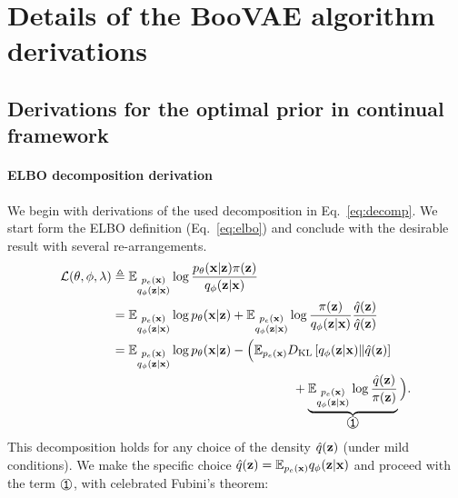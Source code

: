 \section{Details of the BooVAE algorithm derivations}\label{app:algodetails}

\subsection{Derivations for the optimal prior in continual framework}
\label{app:MEPVI}
\paragraph{ELBO decomposition derivation}
We begin with derivations of the used decomposition in Eq.~\ref{eq:decomp}. We start form the ELBO definition (Eq.~\ref{eq:elbo}) and conclude with the desirable result with several re-arrangements. 
\begin{equation}
\label{eq:app_decomp_begin}
    \begin{aligned}
     \mathcal{L}(\theta, \phi, \lambda) &\triangleq  \E_{\substack{p_{e}(\rvx)\\q_{\phi}(\rvz|\rvx)}}\log \dfrac{p_{\theta}(\rvx|\rvz)\pi(\rvz)}{q_{\phi}(\rvz|\rvx)} \\
   & = \E_{\substack{p_{e}(\rvx)\\q_{\phi}(\rvz|\rvx)}}\log p_{\theta}(\rvx|\rvz) + \E_{\substack{p_{e}(\rvx)\\q_{\phi}(\rvz|\rvx)}}\log\dfrac{\pi(\rvz)}{q_{\phi}(\rvz|\rvx)}\frac{\hat{q}(\rvz)}{\hat{q}(\rvz)} \\
    & = \E_{\substack{p_{e}(\rvx)\\q_{\phi}(\rvz|\rvx)}}\log p_{\theta}(\rvx|\rvz) - \Big(\E_{p_{e}(\rvx)}\KL{q_{\phi}(\rvz|\rvx)}{\hat{q}(\rvz)} \\
   &\hspace{50mm}  +\underbrace{\E_{\substack{p_{e}(\rvx)\\q_{\phi}(\rvz|\rvx)}}\log\dfrac{\hat{q}(\rvz)}{\pi(\rvz)}}_{\raisebox{.5pt}{\textcircled{\raisebox{-.9pt} {\text{\ttfamily 1}}}}}\Big).
    \end{aligned}
\end{equation}
This decomposition holds for any choice of the density $\hat{q}({\mathbf{z}})$ (under mild conditions). We make the specific choice $\hat{q}({\mathbf{z}}) = \mathbb{E}_{p_{e}({\mathbf{x}})}q_{\phi}({\mathbf{z}}|{\mathbf{x}})$ and proceed with the term $\raisebox{.5pt}{\textcircled{\raisebox{-.9pt} {\text{\ttfamily 1}}}}$, with celebrated Fubini's theorem:
